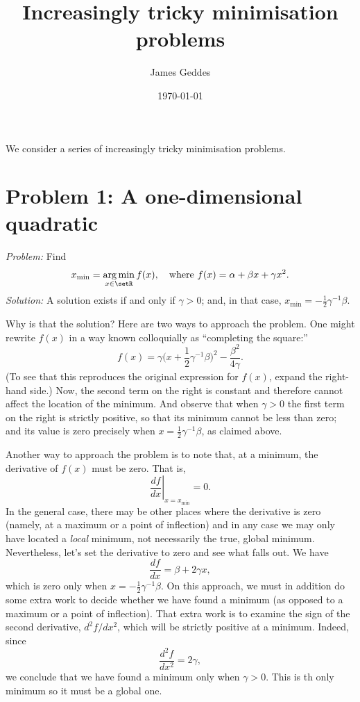 \documentclass[10pt, a4paper]{article}
\title{Increasingly tricky minimisation problems}
\author{James Geddes}
\date{\today}
\DeclareMathOperator*{\argmin}{arg\,min}
\begin{document}
\maketitle

We consider a series of increasingly tricky minimisation problems. 

\section{Problem 1: A one-dimensional quadratic} \label{sec:one-d-quadratic}
  
\emph{Problem:} Find
\begin{equation}
  x_\text{min} = \argmin_{x\in\setR} f(x), \quad\text{where $f(x) = \alpha + \beta x + \gamma x^2$}.
\label{problem-quadr-one-d}
\end{equation}
\emph{Solution:} A solution exists if and only if $\gamma>0$; and, in
that case, $x_\text{min} = -\frac{1}{2}\gamma^{-1}\beta$.

Why is that the solution? Here are two ways to approach the
problem. One might rewrite $f(x)$ in a way known colloquially as
“completing the square:”
\begin{equation*}
  f(x) = \gamma\bigl(x + \frac{1}{2}\gamma^{-1}\beta\bigr)^2 - \frac{\beta^2}{4\gamma}. 
\end{equation*}
(To see that this reproduces the original expression for $f(x)$,
expand the right-hand side.) Now, the second term on the right is
constant and therefore cannot affect the location of the minimum. And
observe that when $\gamma>0$ the first term on the right is strictly
positive, so that its minimum cannot be less than zero; and its value
is zero precisely when $x = \frac{1}{2}\gamma^{-1}\beta$, as claimed above.

Another way to approach the problem is to note that, at a minimum, the
derivative of $f(x)$ must be zero. That is,
\begin{equation*}
  \left.\frac{df}{dx}\right|_{x = x_\text{min}} = 0.
\end{equation*}
In the general case, there may be other places where the derivative is
zero (namely, at a maximum or a point of inflection) and in any case
we may only have located a \emph{local} minimum, not necessarily the
true, global minimum. Nevertheless, let's set the derivative to zero
and see what falls out. We have
\begin{equation*}
  \frac{df}{dx} = \beta + 2 \gamma x,
\end{equation*}
which is zero only when $x = -\frac{1}{2}\gamma^{-1}\beta$. On this approach,
we must in addition do some extra work to decide whether we have found
a minimum (as opposed to a maximum or a point of inflection). That
extra work is to examine the sign of the second derivative,
$d^2f/dx^2$, which will be strictly positive at a minimum. Indeed,
since
\begin{equation*}
  \frac{d^2f}{dx^2} = 2\gamma,
 \end{equation*}
we conclude that we have found a minimum only when $\gamma> 0$. This is th
only minimum so it must be a global one.
\end{document}
